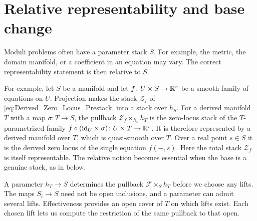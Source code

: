 \section{Relative representability and base change}

Moduli problems often have a parameter stack $S$.
For example, the metric, the domain manifold, or a coefficient in an
equation may vary. The correct representability statement is then
relative to $S$.


For example, let $S$ be a manifold and let
$f\colon U\times S\to\mathbb{R}^r$ be a smooth family of equations on $U$.
Projection makes the stack $\mathcal Z_f$ of
\eqref{eq:Derived_Zero_Locus_Prestack} into a stack over $h_S$. For a
derived manifold $T$ with a map $\sigma\colon T\to S$, the pullback
$\mathcal Z_f\times_{h_S}h_T$ is the zero-locus stack of the
$T$-parametrized family
$f\circ(\mathrm{id}_U\times\sigma)\colon U\times T\to\mathbb{R}^r$. It is
therefore represented by a derived manifold over $T$, which is
quasi-smooth over $T$. Over a real point $s\in S$ it is the derived zero
locus of the single equation $f(-,s)$. Here the total stack
$\mathcal Z_f$ is itself representable. The relative notion becomes
essential when the base is a genuine stack, as in
 below.


A parameter $h_T\to S$ determines the pullback $\mathcal F\times_S h_T$
before we choose any lifts. The maps $S_i\to S$ need not be open
inclusions, and a parameter can admit several lifts. Effectiveness
provides an open cover of $T$ on which lifts exist. Each chosen lift
lets us compute the restriction of the same pullback to that open.

